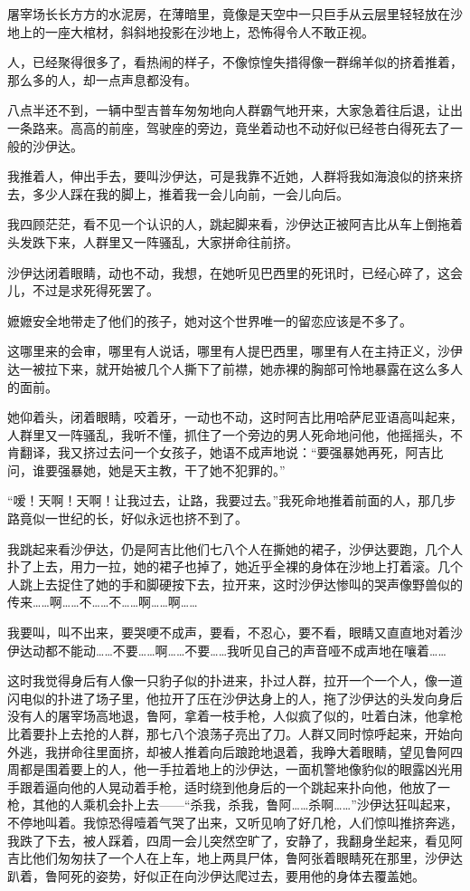 \par 屠宰场长长方方的水泥房，在薄暗里，竟像是天空中一只巨手从云层里轻轻放在沙地上的一座大棺材，斜斜地投影在沙地上，恐怖得令人不敢正视。
\par 人，已经聚得很多了，看热闹的样子，不像惊惶失措得像一群绵羊似的挤着推着，那么多的人，却一点声息都没有。
\par 八点半还不到，一辆中型吉普车匆匆地向人群霸气地开来，大家急着往后退，让出一条路来。高高的前座，驾驶座的旁边，竟坐着动也不动好似已经苍白得死去了一般的沙伊达。
\par 我推着人，伸出手去，要叫沙伊达，可是我靠不近她，人群将我如海浪似的挤来挤去，多少人踩在我的脚上，推着我一会儿向前，一会儿向后。
\par 我四顾茫茫，看不见一个认识的人，跳起脚来看，沙伊达正被阿吉比从车上倒拖着头发跌下来，人群里又一阵骚乱，大家拼命往前挤。
\par 沙伊达闭着眼睛，动也不动，我想，在她听见巴西里的死讯时，已经心碎了，这会儿，不过是求死得死罢了。
\par 嬷嬷安全地带走了他们的孩子，她对这个世界唯一的留恋应该是不多了。
\par 这哪里来的会审，哪里有人说话，哪里有人提巴西里，哪里有人在主持正义，沙伊达一被拉下来，就开始被几个人撕下了前襟，她赤裸的胸部可怜地暴露在这么多人的面前。
\par 她仰着头，闭着眼睛，咬着牙，一动也不动，这时阿吉比用哈萨尼亚语高叫起来，人群里又一阵骚乱，我听不懂，抓住了一个旁边的男人死命地问他，他摇摇头，不肯翻译，我又挤过去问一个女孩子，她语不成声地说：“要强暴她再死，阿吉比问，谁要强暴她，她是天主教，干了她不犯罪的。”
\par “嗳！天啊！天啊！让我过去，让路，我要过去。”我死命地推着前面的人，那几步路竟似一世纪的长，好似永远也挤不到了。
\par 我跳起来看沙伊达，仍是阿吉比他们七八个人在撕她的裙子，沙伊达要跑，几个人扑了上去，用力一拉，她的裙子也掉了，她近乎全裸的身体在沙地上打着滚。几个人跳上去捉住了她的手和脚硬按下去，拉开来，这时沙伊达惨叫的哭声像野兽似的传来……啊……不……不……啊……啊……
\par 我要叫，叫不出来，要哭哽不成声，要看，不忍心，要不看，眼睛又直直地对着沙伊达动都不能动……不要……啊……不要……我听见自己的声音哑不成声地在嚷着……
\par 这时我觉得身后有人像一只豹子似的扑进来，扑过人群，拉开一个一个人，像一道闪电似的扑进了场子里，他拉开了压在沙伊达身上的人，拖了沙伊达的头发向身后没有人的屠宰场高地退，鲁阿，拿着一枝手枪，人似疯了似的，吐着白沫，他拿枪比着要扑上去抢的人群，那七八个浪荡子亮出了刀。人群又同时惊呼起来，开始向外逃，我拼命往里面挤，却被人推着向后踉跄地退着，我睁大着眼睛，望见鲁阿四周都是围着要上的人，他一手拉着地上的沙伊达，一面机警地像豹似的眼露凶光用手跟着逼向他的人晃动着手枪，适时绕到他身后的一个跳起来扑向他，他放了一枪，其他的人乘机会扑上去——“杀我，杀我，鲁阿……杀啊……”沙伊达狂叫起来，不停地叫着。我惊恐得噎着气哭了出来，又听见响了好几枪，人们惊叫推挤奔逃，我跌了下去，被人踩着，四周一会儿突然空旷了，安静了，我翻身坐起来，看见阿吉比他们匆匆扶了一个人在上车，地上两具尸体，鲁阿张着眼睛死在那里，沙伊达趴着，鲁阿死的姿势，好似正在向沙伊达爬过去，要用他的身体去覆盖她。
